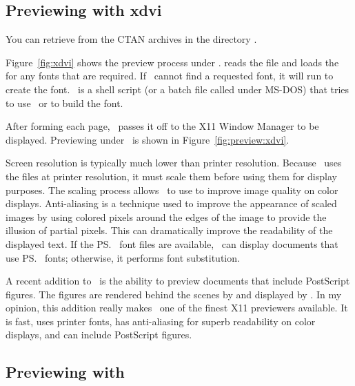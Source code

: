 \subsection{Previewing with xdvi}

You can retrieve  from the CTAN archives in the
directory .

Figure~\ref{fig:xdvi} shows the preview process under \xdvi.  
 reads the  file and loads the 
for any fonts that are required.  If \xdvi\ cannot find a requested
font, it will run  to create the font.  \MakeTeXPK\ is a
shell script (or a batch file called  under MS-DOS)
that tries to use \MF\ or  to build the font.


After forming each page, \xdvi\ passes it off to the X11 Window Manager to be
displayed.  Previewing under \xdvi\ is shown in Figure~\ref{fig:preview:xdvi}.


Screen resolution is typically much lower than printer resolution.  Because
\xdvi\ uses the  files at printer resolution, it must scale them
before using them for display purposes.  The scaling process allows \xdvi\ to
use  to improve image quality on color
displays.  Anti-aliasing is a technique used to improve the appearance of
scaled images by using colored pixels around the edges of the image to provide
the illusion of partial pixels.  This can dramatically improve the readability
of the displayed text.  If the \ps\ font files are available, \xdvi\ can
display documents that use \ps\ fonts; otherwise, it performs font
substitution.  

A recent addition to \xdvi\ is the ability to preview documents that
include PostScript figures.  The figures are rendered behind the scenes
by  and displayed by \xdvi.  
In my opinion, this addition really makes \xdvi\ one of the finest X11 
previewers available.  It is fast, uses printer fonts, has anti-aliasing for 
superb readability on color displays, and can include PostScript figures.

\subsection{Previewing with \protect\xtex}

